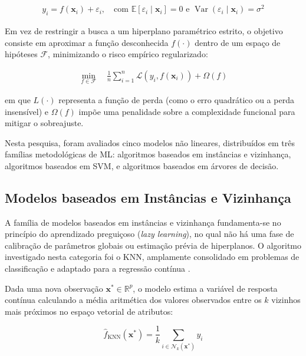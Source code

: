 \begin{align}
y_i = f(\mathbf{x}_i) + \varepsilon_i, \quad \text{com } \mathbb{E}[\varepsilon_i \mid \mathbf{x}_i] = 0 \text{ e } \operatorname{Var}(\varepsilon_i \mid \mathbf{x}_i) = \sigma^2 \label{eq:regressao_nao_linear_geral}
\end{align}

Em vez de restringir a busca a um hiperplano paramétrico estrito, o objetivo consiste em aproximar a função desconhecida $f(\cdot)$ dentro de um espaço de hipóteses $\mathcal{F}$, minimizando o risco empírico regularizado:

\begin{align}
\min_{f \in \mathcal{F}} \quad \frac{1}{n} \sum_{i=1}^{n} \mathcal{L}(y_i, f(\mathbf{x}_i)) + \Omega(f) \label{eq:otimizacao_nao_linear}
\end{align}

\noindent em que $L(\cdot)$ representa a função de perda (como o erro quadrático ou a perda insensível) e $\Omega(f)$ impõe uma penalidade sobre a complexidade funcional para mitigar o sobreajuste.

Nesta pesquisa, foram avaliados cinco modelos não lineares, distribuídos em três famílias metodológicas de \gls{ML}: algoritmos baseados em instâncias e vizinhança, algoritmos baseados em \gls{SVM}, e algoritmos baseados em árvores de decisão.

\subsection{Modelos baseados em Instâncias e Vizinhança}

A família de modelos baseados em instâncias e vizinhança fundamenta-se no princípio do aprendizado preguiçoso (\textit{lazy learning}), no qual não há uma fase de calibração de parâmetros globais ou estimação prévia de hiperplanos. O algoritmo investigado nesta categoria foi o \gls{KNN}, amplamente consolidado em problemas de classificação e adaptado para a regressão contínua \cite{ibm_knn}.

Dada uma nova observação $\mathbf{x}^* \in \mathbb{R}^p$, o modelo estima a variável de resposta contínua calculando a média aritmética dos valores observados entre os $k$ vizinhos mais próximos no espaço vetorial de atributos:

\begin{equation}
\hat{f}_{\text{KNN}}(\mathbf{x}^*) = \frac{1}{k} \sum_{i \in \mathcal{N}_k(\mathbf{x}^*)} y_i \label{eq:predicao_knn}
\end{equation}

